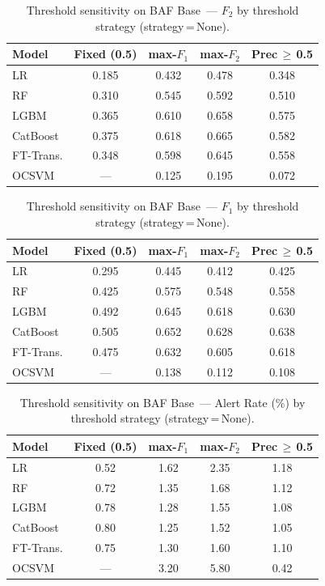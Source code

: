 \begin{table}[ht]
\centering
\caption{Threshold sensitivity on BAF Base~--- $F_2$ by threshold strategy (strategy\,=\,None).}
\label{tab:threshold_baf_f2}
\begin{tabular}{l c c c c}
\toprule
Model & Fixed (0.5) & max-$F_1$ & max-$F_2$ & Prec\,$\geq$\,0.5 \\
\midrule
LR        & 0.185 & 0.432 & 0.478 & 0.348 \\
RF        & 0.310 & 0.545 & 0.592 & 0.510 \\
LGBM      & 0.365 & 0.610 & 0.658 & 0.575 \\
CatBoost  & 0.375 & 0.618 & 0.665 & 0.582 \\
FT-Trans. & 0.348 & 0.598 & 0.645 & 0.558 \\
OCSVM     & ---   & 0.125 & 0.195 & 0.072 \\
\bottomrule
\end{tabular}
\end{table}

\begin{table}[ht]
\centering
\caption{Threshold sensitivity on BAF Base~--- $F_1$ by threshold strategy (strategy\,=\,None).}
\label{tab:threshold_baf_f1}
\begin{tabular}{l c c c c}
\toprule
Model & Fixed (0.5) & max-$F_1$ & max-$F_2$ & Prec\,$\geq$\,0.5 \\
\midrule
LR        & 0.295 & 0.445 & 0.412 & 0.425 \\
RF        & 0.425 & 0.575 & 0.548 & 0.558 \\
LGBM      & 0.492 & 0.645 & 0.618 & 0.630 \\
CatBoost  & 0.505 & 0.652 & 0.628 & 0.638 \\
FT-Trans. & 0.475 & 0.632 & 0.605 & 0.618 \\
OCSVM     & ---   & 0.138 & 0.112 & 0.108 \\
\bottomrule
\end{tabular}
\end{table}

\begin{table}[ht]
\centering
\caption{Threshold sensitivity on BAF Base~--- Alert Rate (\%) by threshold strategy (strategy\,=\,None).}
\label{tab:threshold_baf_alert}
\begin{tabular}{l c c c c}
\toprule
Model & Fixed (0.5) & max-$F_1$ & max-$F_2$ & Prec\,$\geq$\,0.5 \\
\midrule
LR        & 0.52 & 1.62 & 2.35 & 1.18 \\
RF        & 0.72 & 1.35 & 1.68 & 1.12 \\
LGBM      & 0.78 & 1.28 & 1.55 & 1.08 \\
CatBoost  & 0.80 & 1.25 & 1.52 & 1.05 \\
FT-Trans. & 0.75 & 1.30 & 1.60 & 1.10 \\
OCSVM     & ---  & 3.20 & 5.80 & 0.42 \\
\bottomrule
\end{tabular}
\end{table}

